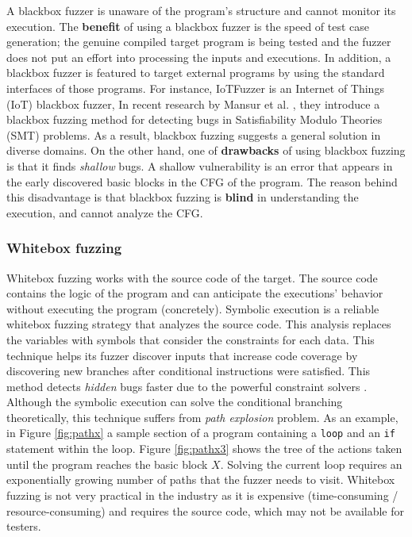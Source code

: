 A blackbox fuzzer is unaware of the program's structure and cannot monitor its execution. The \textbf{benefit} of using a blackbox fuzzer is the speed of test case generation; the genuine compiled target program is being tested and the fuzzer does not put an effort into processing the inputs and executions. In addition, a blackbox fuzzer is featured to target external programs by using the standard interfaces of those programs. For instance, IoTFuzzer \cite{chen2018iotfuzzer} is an Internet of Things (IoT) blackbox fuzzer,  
In recent research by Mansur et al. \cite{mansur2020detecting}, they introduce a blackbox fuzzing method for detecting bugs in Satisfiability Modulo Theories (SMT) problems. As a result, blackbox fuzzing suggests a general solution in diverse domains. On the other hand, one of \textbf{drawbacks} of using blackbox fuzzing is that it finds \textit{shallow} bugs. A shallow vulnerability is an error that appears in the early discovered basic blocks in the CFG of the program. The reason behind this disadvantage is that blackbox fuzzing is \textbf{blind} in understanding the execution, and cannot analyze the CFG.


\subsubsection{Whitebox fuzzing}

Whitebox fuzzing works with the source code of the target. The source code contains the logic of the program and can anticipate the executions' behavior without executing the program (concretely). Symbolic execution \cite{king1976symbolic} is a reliable whitebox fuzzing strategy that analyzes the source code. This analysis replaces the variables with symbols that consider the constraints for each data. This technique helps its fuzzer discover inputs that increase code coverage by discovering new branches after conditional instructions were satisfied. This method detects \textit{hidden} bugs faster due to the powerful constraint solvers \cite{godefroid2008automated}. Although the symbolic execution can solve the conditional branching theoretically, this technique suffers from \textit{path explosion} problem. As an example, in Figure \ref{fig:pathx} a sample section of a program containing a \texttt{loop} and an \texttt{if} statement within the loop. Figure \ref{fig:pathx3} shows the tree of the actions taken until the program reaches the basic block $X$. Solving the current loop requires an exponentially growing number of paths that the fuzzer needs to visit. Whitebox fuzzing is not very practical in the industry as it is expensive (time-consuming / resource-consuming) and requires the source code, which may not be available for testers.

